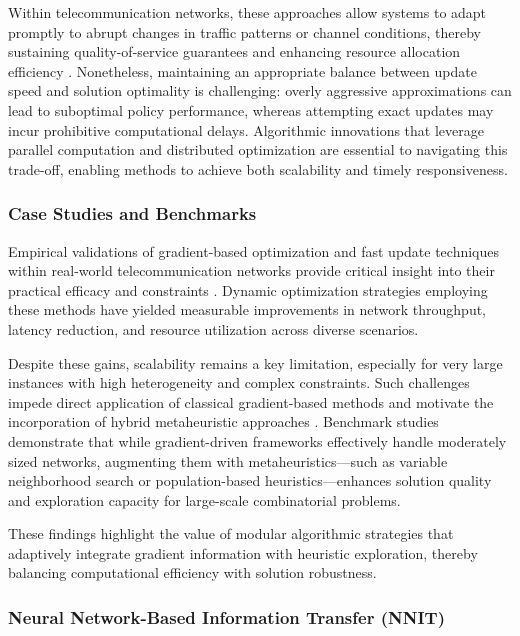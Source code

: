 \documentclass[sigconf]{acmart}
\begin{document}
Within telecommunication networks, these approaches allow systems to adapt promptly to abrupt changes in traffic patterns or channel conditions, thereby sustaining quality-of-service guarantees and enhancing resource allocation efficiency \cite{ref10}. Nonetheless, maintaining an appropriate balance between update speed and solution optimality is challenging: overly aggressive approximations can lead to suboptimal policy performance, whereas attempting exact updates may incur prohibitive computational delays. Algorithmic innovations that leverage parallel computation and distributed optimization are essential to navigating this trade-off, enabling methods to achieve both scalability and timely responsiveness.

\subsubsection{Case Studies and Benchmarks}

Empirical validations of gradient-based optimization and fast update techniques within real-world telecommunication networks provide critical insight into their practical efficacy and constraints \cite{ref1,ref4,ref10,ref37,ref47}. Dynamic optimization strategies employing these methods have yielded measurable improvements in network throughput, latency reduction, and resource utilization across diverse scenarios.

Despite these gains, scalability remains a key limitation, especially for very large instances with high heterogeneity and complex constraints. Such challenges impede direct application of classical gradient-based methods and motivate the incorporation of hybrid metaheuristic approaches \cite{ref37}. Benchmark studies demonstrate that while gradient-driven frameworks effectively handle moderately sized networks, augmenting them with metaheuristics—such as variable neighborhood search or population-based heuristics—enhances solution quality and exploration capacity for large-scale combinatorial problems.

These findings highlight the value of modular algorithmic strategies that adaptively integrate gradient information with heuristic exploration, thereby balancing computational efficiency with solution robustness.

\subsubsection{Neural Network-Based Information Transfer (NNIT)}
\end{document}
